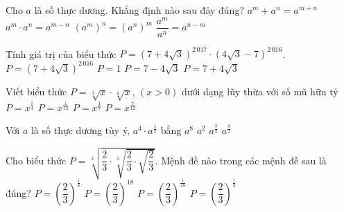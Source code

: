 \begin{ex}%
	Cho $a$  là số thực dương. Khẳng định nào sau đây đúng?
	 \choice
		{$a^m+a^n=a^{m+n}$} 
		 {$a^m\cdot a^n=a^{m-n}$}
		{\True  $(a^m)^n=(a^n)^m$}
		{$\dfrac{a^m}{a^n}=a^{n-m}$} 
\end{ex}

\begin{ex}%
	Tính giá trị của biểu thức $P=\left(7+4\sqrt{3}\right)^{2\, 017}\cdot \left(4\sqrt{3}-7\right)^{2\,  016}$.
	 \choice
		 {$P=\left(7+4\sqrt{3}\right)^{2\, 016}$}
		 {$P=1$}
		{$P=7-4\sqrt{3}$} 
		{\True  $P=7+4\sqrt{3}$}
\end{ex}

\begin{ex}%
	Viết biểu thức $P=\sqrt[3]{x}\cdot \sqrt[4]{x}$, $\left(x>0\right)$ dưới dạng lũy thừa với số mũ hữu  tỷ
	\choice 
		 {$P=x^{\tfrac{5}{4}}$}
		{$P=x^{\tfrac{1}{12}}$} 
		{$P=x^{\tfrac{1}{7}}$} 
		 {\True $P=x^{\tfrac{7}{12}}$}
\end{ex}

\begin{ex}%
	Với $a$ là số thực  dương tùy ý, $a^4\cdot a^{\tfrac{1}{2}}$ bằng
	 \choice
		 {$a^8$}
		{$a^2$} 
		{$a^{\tfrac{7}{2}}$} 
		 {\True $a^{\tfrac{9}{2}}$}
\end{ex}

\begin{ex}%
	Cho biểu thức $P=\sqrt[3]{\dfrac{2}{3}\cdot\sqrt[3]{\dfrac{2}{3}\cdot\sqrt{\dfrac{2}{3}}}}$. Mệnh đề nào  trong các mệnh đề sau là đúng?
	\choice 
		 {$P=\left(\dfrac{2}{3}\right)^{\tfrac{1}{8}}$}
		{$P=\left(\dfrac{2}{3}\right)^{18}$} 
		 {$P=\left(\dfrac{2}{3}\right)^{\tfrac{1}{18}}$}
		{\True  $P=\left(\dfrac{2}{3}\right)^{\tfrac{1}{2}}$}
\end{ex}

